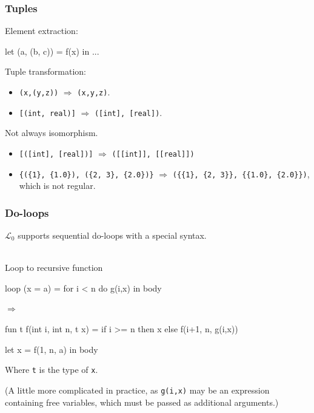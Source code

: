 \documentclass{beamer}
\renewcommand{\emph}[1]{\textcolor{structure}{#1}}
\newcommand{\emp}[1]{\textcolor{DikuRed}{ #1}}
\newcommand{\LO}{$\mathcal{L}_0$}
\begin{document}
\begin{frame}[fragile,t]
  \frametitle{Tuples}

  Element extraction:

  \begin{colorcode}
    let (a, (b, c)) = f(x) in
    ...
  \end{colorcode}

  \pause

Tuple transformation:

  \begin{itemize}
  \item {\tt (x,(y,z))} $\Rightarrow$ {\tt (x,y,z)}.
  \item {\tt [(int, real)]} $\Rightarrow$ {\tt ([int], [real])}.
  \end{itemize}

\pause

Not always isomorphism.

\begin{itemize}
\item {\tt [([int], [real])]} $\Rightarrow$ {\tt([[int]], [[real]])}
\item {\tt\{(\{1\}, \{1.0\}), (\{2, 3\}, \{2.0\})\}} $\Rightarrow$
  {\tt(\{\{1\}, \{2, 3\}\}, \{\{1.0\}, \{2.0\}\})}, which is not
  regular.
\end{itemize}

\end{frame}

\begin{frame}[fragile,t]
  \frametitle{Do-loops}

  \LO{} supports sequential do-loops with a special syntax.\\
  \hfill\\
  \begin{block}{Loop to recursive function}
    \begin{minipage}{0.2\columnwidth}
      \begin{colorcode}
loop (x = a) =
  for i < n do
    \emp{g(i,x)}
in \emph{body}
      \end{colorcode}
    \end{minipage}
    \pause
    \begin{minipage}{0.05\columnwidth}
      $\Rightarrow$
    \end{minipage}
    \begin{minipage}{0.1\columnwidth}
      \begin{colorcode}
fun t f(int i, int n, t x) =
  if i >= n
    then x
    else f(i+1, n, \emp{g(i,x)})

let x = f(1, n, a)
in \emph{body}
      \end{colorcode}
    \end{minipage}
  \end{block}

  Where {\tt t} is the type of {\tt x}.

  (A little more complicated in practice, as {\tt g(i,x)} may be an
  expression containing free variables, which must be passed as
  additional arguments.)

\end{frame}
\end{document}
